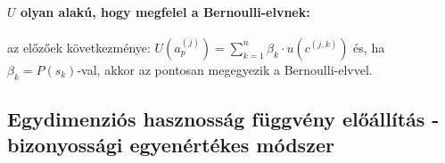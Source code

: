 \documentclass[a4paper,12pt]{article}
\begin{document}
\paragraph{$U$ olyan alakú, hogy megfelel a Bernoulli-elvnek:} az előzőek következménye: $U(a^{(j)}_p) = \sum^n_{k=1} \beta_k \cdot  u(c^{(j,k)})$ és, ha $\beta_k = P(s_k)$-val, akkor az pontosan megegyezik a Bernoulli-elvvel.  






\subsection{Egydimenziós hasznosság függvény előállítás - bizonyossági egyenértékes módszer}
\end{document}
